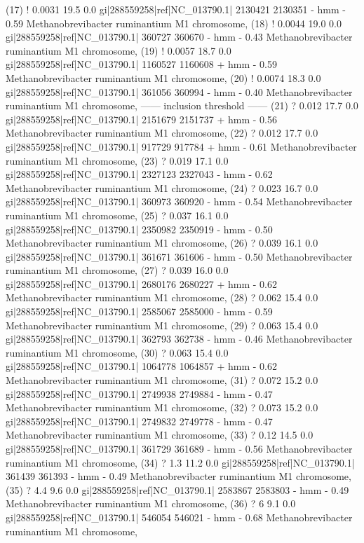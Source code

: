 \begin{sreoutput}
 (17) !    0.0031   19.5   0.0  gi|288559258|ref|NC_013790.1| 2130421 2130351 - hmm     - 0.59  Methanobrevibacter ruminantium M1 chromosome, 
 (18) !    0.0044   19.0   0.0  gi|288559258|ref|NC_013790.1|  360727  360670 - hmm     - 0.43  Methanobrevibacter ruminantium M1 chromosome, 
 (19) !    0.0057   18.7   0.0  gi|288559258|ref|NC_013790.1| 1160527 1160608 + hmm     - 0.59  Methanobrevibacter ruminantium M1 chromosome, 
 (20) !    0.0074   18.3   0.0  gi|288559258|ref|NC_013790.1|  361056  360994 - hmm     - 0.40  Methanobrevibacter ruminantium M1 chromosome, 
 ------ inclusion threshold ------
 (21) ?     0.012   17.7   0.0  gi|288559258|ref|NC_013790.1| 2151679 2151737 + hmm     - 0.56  Methanobrevibacter ruminantium M1 chromosome, 
 (22) ?     0.012   17.7   0.0  gi|288559258|ref|NC_013790.1|  917729  917784 + hmm     - 0.61  Methanobrevibacter ruminantium M1 chromosome, 
 (23) ?     0.019   17.1   0.0  gi|288559258|ref|NC_013790.1| 2327123 2327043 - hmm     - 0.62  Methanobrevibacter ruminantium M1 chromosome, 
 (24) ?     0.023   16.7   0.0  gi|288559258|ref|NC_013790.1|  360973  360920 - hmm     - 0.54  Methanobrevibacter ruminantium M1 chromosome, 
 (25) ?     0.037   16.1   0.0  gi|288559258|ref|NC_013790.1| 2350982 2350919 - hmm     - 0.50  Methanobrevibacter ruminantium M1 chromosome, 
 (26) ?     0.039   16.1   0.0  gi|288559258|ref|NC_013790.1|  361671  361606 - hmm     - 0.50  Methanobrevibacter ruminantium M1 chromosome, 
 (27) ?     0.039   16.0   0.0  gi|288559258|ref|NC_013790.1| 2680176 2680227 + hmm     - 0.62  Methanobrevibacter ruminantium M1 chromosome, 
 (28) ?     0.062   15.4   0.0  gi|288559258|ref|NC_013790.1| 2585067 2585000 - hmm     - 0.59  Methanobrevibacter ruminantium M1 chromosome, 
 (29) ?     0.063   15.4   0.0  gi|288559258|ref|NC_013790.1|  362793  362738 - hmm     - 0.46  Methanobrevibacter ruminantium M1 chromosome, 
 (30) ?     0.063   15.4   0.0  gi|288559258|ref|NC_013790.1| 1064778 1064857 + hmm     - 0.62  Methanobrevibacter ruminantium M1 chromosome, 
 (31) ?     0.072   15.2   0.0  gi|288559258|ref|NC_013790.1| 2749938 2749884 - hmm     - 0.47  Methanobrevibacter ruminantium M1 chromosome, 
 (32) ?     0.073   15.2   0.0  gi|288559258|ref|NC_013790.1| 2749832 2749778 - hmm     - 0.47  Methanobrevibacter ruminantium M1 chromosome, 
 (33) ?      0.12   14.5   0.0  gi|288559258|ref|NC_013790.1|  361729  361689 - hmm     - 0.56  Methanobrevibacter ruminantium M1 chromosome, 
 (34) ?       1.3   11.2   0.0  gi|288559258|ref|NC_013790.1|  361439  361393 - hmm     - 0.49  Methanobrevibacter ruminantium M1 chromosome, 
 (35) ?       4.4    9.6   0.0  gi|288559258|ref|NC_013790.1| 2583867 2583803 - hmm     - 0.49  Methanobrevibacter ruminantium M1 chromosome, 
 (36) ?         6    9.1   0.0  gi|288559258|ref|NC_013790.1|  546054  546021 - hmm     - 0.68  Methanobrevibacter ruminantium M1 chromosome, 
\end{sreoutput}

